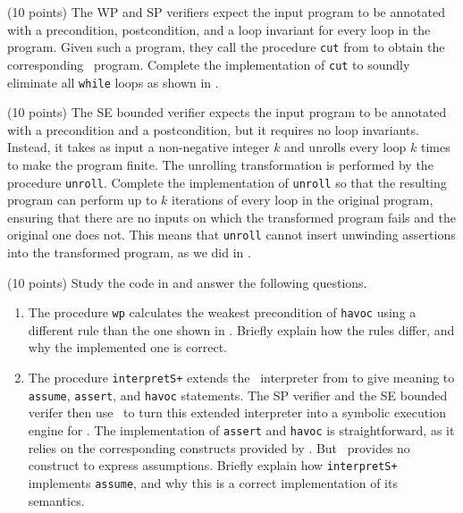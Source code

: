 \documentclass{handout}
\begin{document}
\begin{questions}

\item (10 points) \label{prob:ivl-inv} The WP and SP verifiers expect the input
program to be annotated with a precondition, postcondition, and a loop invariant
for every loop in the program. Given such a program, they call the procedure
\lstinline{cut} from  to obtain the corresponding \ivl\
program. Complete the implementation of \lstinline{cut} to soundly eliminate all
\lstinline{while} loops as shown in \lecture{13}.



\item (10 points) \label{prob:ivl-unroll} The SE bounded verifier expects the
input program to be annotated with a precondition and a postcondition, but it
requires no loop invariants.  Instead, it takes as input a non-negative integer
$k$ and unrolls every loop $k$ times to make the program finite. The unrolling
transformation is performed by the procedure \lstinline{unroll}. Complete the
implementation of \lstinline{unroll}  so that the resulting \ivl program can
perform up to $k$ iterations of every loop in the original \imp program,
ensuring that  there are no inputs on which the transformed program fails and
the original one does not. This means that \lstinline{unroll} cannot insert
unwinding assertions into the transformed program, as we did in \lecture{5}.  



\item (10 points) \label{prob:ver-study} Study the code in 
and answer the following questions.

\begin{enumerate}
\item The procedure \lstinline{wp} calculates the weakest precondition of
 \lstinline{havoc} using a different rule than the one shown in .
 Briefly explain how the rules differ, and why the implemented one is
 correct.\looseness=-1



\item The procedure \lstinline{interpretS+} extends the \imp\ interpreter from
 \src[imp/]{imp.rkt} to give meaning to \lstinline{assume}, \lstinline{assert},
 and \lstinline{havoc} statements. The SP verifier and the SE bounded verifer
 then use \rosette\ to turn this extended interpreter into a symbolic execution
 engine for \ivl. The implementation of \lstinline{assert} and \lstinline{havoc}
 is straightforward, as it relies on the corresponding constructs provided by
 \rosette. But \rosette\ provides no construct to express assumptions. Briefly
 explain how \lstinline{interpretS+} implements  \lstinline{assume}, and why
 this is a correct implementation of its semantics. 
 \end{enumerate} 




\end{questions}
\end{document}
